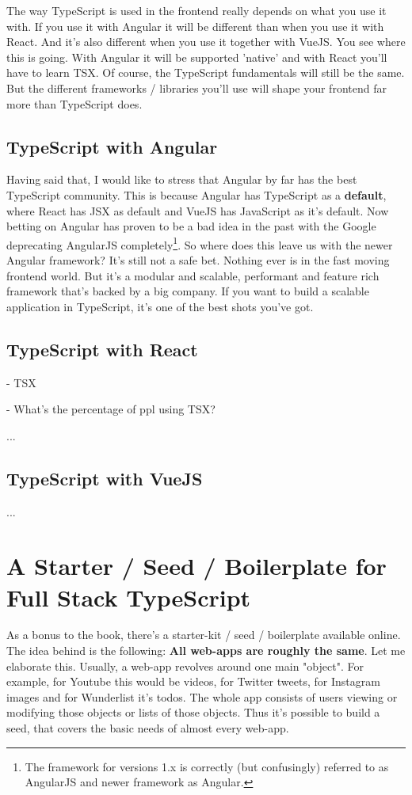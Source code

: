 \documentclass[12pt,a4paper]{report}
\begin{document}
The way TypeScript is used in the frontend really depends on what you use it with. If you use it with Angular it will be different than when you use it with React. And it's also different when you use it together with VueJS. You see where this is going. With Angular it will be supported 'native' and with React you'll have to learn TSX. Of course, the TypeScript fundamentals will still be the same. But the different frameworks / libraries you'll use will shape your frontend far more than TypeScript does.

\section{TypeScript with Angular}

Having said that, I would like to stress that Angular by far has the best TypeScript community. This is because Angular has TypeScript as a \textbf{default}, where React has JSX as default and VueJS has JavaScript as it's default. Now betting on Angular has proven to be a bad idea in the past with the Google deprecating AngularJS completely\footnote{The framework for versions 1.x is correctly (but confusingly) referred to as AngularJS and newer framework as Angular.}. So where does this leave us with the newer Angular framework? It's still not a safe bet. Nothing ever is in the fast moving frontend world. But it's  a modular and scalable, performant and feature rich framework that's backed by a big company. If you want to build a scalable application in TypeScript, it's one of the best shots you've got.


\section{TypeScript with React}

- TSX

- What's the percentage of ppl using TSX?

...


\section{TypeScript with VueJS}

...


\chapter{A Starter / Seed / Boilerplate for Full Stack TypeScript}

As a bonus to the book, there's a starter-kit / seed / boilerplate available online. The idea behind is the following: \textbf{All web-apps are roughly the same}. Let me elaborate this. Usually, a web-app revolves around one main "object". For example, for Youtube this would be videos, for Twitter tweets, for Instagram images and for Wunderlist it's todos. The whole app consists of users viewing or modifying those objects or lists of those objects. Thus it's possible to build a seed, that covers the basic needs of almost every web-app.
\end{document}
